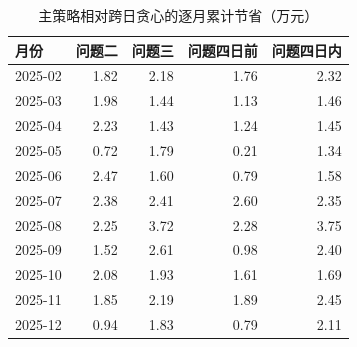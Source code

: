 \begin{table}[H]\centering\small
\caption{主策略相对跨日贪心的逐月累计节省（万元）}
\begin{tabular}{lrrrr}\toprule
月份 & 问题二 & 问题三 & 问题四日前 & 问题四日内 \\ \midrule
2025-02 & 1.82 & 2.18 & 1.76 & 2.32 \\
2025-03 & 1.98 & 1.44 & 1.13 & 1.46 \\
2025-04 & 2.23 & 1.43 & 1.24 & 1.45 \\
2025-05 & 0.72 & 1.79 & 0.21 & 1.34 \\
2025-06 & 2.47 & 1.60 & 0.79 & 1.58 \\
2025-07 & 2.38 & 2.41 & 2.60 & 2.35 \\
2025-08 & 2.25 & 3.72 & 2.28 & 3.75 \\
2025-09 & 1.52 & 2.61 & 0.98 & 2.40 \\
2025-10 & 2.08 & 1.93 & 1.61 & 1.69 \\
2025-11 & 1.85 & 2.19 & 1.89 & 2.45 \\
2025-12 & 0.94 & 1.83 & 0.79 & 2.11 \\
\bottomrule\end{tabular}\end{table}
